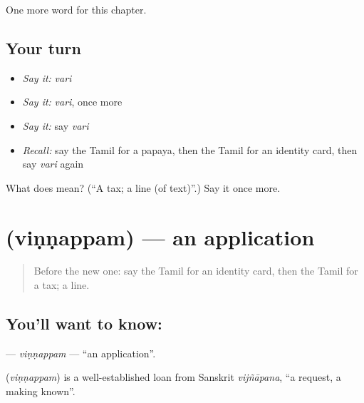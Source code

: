 \begin{grammarlens}[title={What you've built}]
One more word for this chapter.
\end{grammarlens}

\subsection*{Your turn}
\begin{itemize}
\raggedright
  \item \emph{Say it:} \emph{vari}
  \item \emph{Say it:} \emph{vari}, once more
  \item \emph{Say it:} say \emph{vari}
  \item \emph{Recall:} say the Tamil for a papaya, then the Tamil for an identity card, then say \emph{vari} again
\end{itemize}

\begin{tcolorbox}[breakable,colback=teal!4,colframe=teal!35!black,title={Before you move on}]
What does  mean? (\textquotedblleft{}A tax; a line (of text)\textquotedblright{}.) Say it once more.
\end{tcolorbox}
\section[\texorpdfstring{\ta{விண்ணப்பம்} (viṇṇappam)}{விண்ணப்பம் (viṇṇappam)}]{ (viṇṇappam) — an application}

\label{lesson:TA-C272-vinnappam}



\begin{quote}
Before the new one: say the Tamil for an identity card, then the Tamil for a tax; a line.
\end{quote}

\subsection*{You'll want to know: }
\textbf{} — \emph{viṇṇappam} — \textquotedblleft{}an application\textquotedblright{}.

\begin{cousinweb}
\textbf{} (\emph{viṇṇappam}) is a well-established loan from Sanskrit \emph{vijñāpana}, \textquotedblleft{}a request, a making known\textquotedblright{}.
\end{cousinweb}

